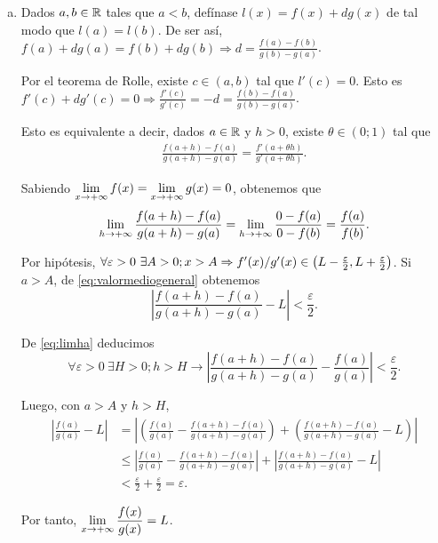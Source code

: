 
{
	\newcommand{\ba}{\frac{f(b)-f(a)}{g(b)-g(a)}}
	\newcommand{\ha}{\frac{f(a+h)-f(a)}{g(a+h)-g(a)}}

	\hfill

	\begin{enumerate}[a)]
		
		\item 

			Dados $a,b\in\mathbb{R}$ tales que $a<b$, defínase $l(x) = f(x) + d g(x)$ de tal modo que $l(a)=l(b)$.
			De ser así, $f(a) + d g(a) = f(b) + d g(b) \Rightarrow d = \frac{f(a)-f(b)}{g(b)-g(a)}$.

			Por el teorema de Rolle, existe $c\in(a,b)$ tal que $l'(c) = 0$.
			Esto es $f'(c) + d g'(c) = 0 \Rightarrow \frac{f'(c)}{g'(c)} = -d = \ba$.

			Esto es equivalente a decir, dados $a\in\mathbb{R}$ y $h>0$, existe $\theta\in(0;1)$ tal que 
			\begin{align} \label{eq:valormediogeneral}
				\ha = \frac{f'(a+\theta h)}{g'(a+\theta h)} .
			\end{align}

			Sabiendo $\limite{x}{f(x)} = \limite{x}{g(x)} = 0$, obtenemos que 
			\begin{align} \label{eq:limha}
				\limite{h}{\ha} = \limite{h}{\frac{0-f(a)}{0-f(b)}} = \frac{f(a)}{f(b)} .
			\end{align}

			Por hipótesis, $\forall\varepsilon>0\ \exists A>0; x>A\Rightarrow f'(x)/g'(x) \in \openci{L}{\frac{\varepsilon}{2}}$.
			Si $a>A$, de \eqref{eq:valormediogeneral} obtenemos 
			$$ \left| \ha - L \right| < \frac{\varepsilon}{2}.$$

			De \eqref{eq:limha} deducimos
			$$ \forall\varepsilon>0\ \exists H>0; h>H \rightarrow \left| \ha - \frac{f(a)}{g(a)} \right| < \frac{\varepsilon}{2} .$$

			Luego, con $a>A$ y $h>H$,
			\begin{align*}
				\left| \frac{f(a)}{g(a)} - L \right|
					&= \left| \left(\frac{f(a)}{g(a)} - \ha \right) + \left(\ha - L \right) \right| \\
					&\leq \left| \frac{f(a)}{g(a)} - \ha \right| + \left|\ha - L \right| \\
					& < \frac{\varepsilon}{2} + \frac{\varepsilon}{2} = \varepsilon .
			\end{align*}

			Por tanto, $\limite{x}{\frac{f(x)}{g(x)} = L}$.


\end{enumerate}}
